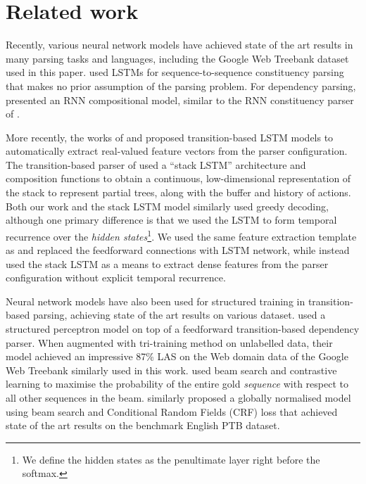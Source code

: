 \section{Related work} Recently, various neural network models have achieved state of the art results in many parsing tasks and languages, including the Google Web Treebank dataset used in this paper.  used LSTMs for sequence-to-sequence constituency parsing that makes no prior assumption of the parsing problem. For dependency parsing,  presented an RNN compositional model, similar to the RNN constituency parser of . 

More recently, the works of  and  proposed transition-based LSTM models to automatically extract real-valued feature vectors from the parser configuration. The transition-based parser of  used a ``stack LSTM'' architecture and composition functions to obtain a continuous, low-dimensional representation of the stack to represent partial trees, along with the buffer and history of actions. Both our work and the stack LSTM model similarly used greedy decoding, although one primary difference is that we used the LSTM to form temporal recurrence over the \emph{hidden states}\footnote{We define the hidden states as the penultimate layer right before the softmax.}. We used the same feature extraction template as  and replaced the feedforward connections with LSTM network, while  instead used the stack LSTM as a means to extract dense features from the parser configuration without explicit temporal recurrence.%

Neural network models have also been used for structured training in transition-based parsing, achieving state of the art results on various dataset.  used a structured perceptron model on top of a feedforward transition-based dependency parser. When augmented with tri-training method on unlabelled data, their model achieved an impressive 87\% LAS on the Web domain data of the Google Web Treebank similarly used in this work.  used beam search and contrastive learning to maximise the probability of the entire gold \emph{sequence} with respect to all other sequences in the beam.  similarly proposed a globally normalised model using beam search and Conditional Random Fields (CRF) loss \cite{Let01} that achieved state of the art results on the benchmark English PTB dataset. 

